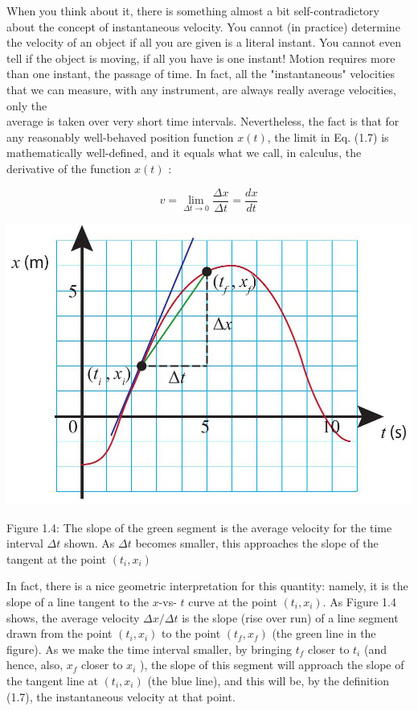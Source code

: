 \documentclass[10pt]{article}
\begin{document}
When you think about it, there is something almost a bit self-contradictory about the concept of instantaneous velocity. You cannot (in practice) determine the velocity of an object if all you are given is a literal instant. You cannot even tell if the object is moving, if all you have is one instant! Motion requires more than one instant, the passage of time. In fact, all the "instantaneous" velocities that we can measure, with any instrument, are always really average velocities, only the\\
average is taken over very short time intervals. Nevertheless, the fact is that for any reasonably well-behaved position function $x(t)$, the limit in Eq. (1.7) is mathematically well-defined, and it equals what we call, in calculus, the derivative of the function $x(t)$ :


\begin{equation*}
v=\lim _{\Delta t \rightarrow 0} \frac{\Delta x}{\Delta t}=\frac{d x}{d t} \tag{1.8}
\end{equation*}


\begin{center}
\includegraphics[max width=\textwidth]{2024_09_14_9969b06773f10b6936e8g-028}
\end{center}

Figure 1.4: The slope of the green segment is the average velocity for the time interval $\Delta t$ shown. As $\Delta t$ becomes smaller, this approaches the slope of the tangent at the point $\left(t_{i}, x_{i}\right)$

In fact, there is a nice geometric interpretation for this quantity: namely, it is the slope of a line tangent to the $x$-vs- $t$ curve at the point $\left(t_{i}, x_{i}\right)$. As Figure 1.4 shows, the average velocity $\Delta x / \Delta t$ is the slope (rise over run) of a line segment drawn from the point $\left(t_{i}, x_{i}\right)$ to the point $\left(t_{f}, x_{f}\right)$ (the green line in the figure). As we make the time interval smaller, by bringing $t_{f}$ closer to $t_{i}$ (and hence, also, $x_{f}$ closer to $x_{i}$ ), the slope of this segment will approach the slope of the tangent line at $\left(t_{i}, x_{i}\right)$ (the blue line), and this will be, by the definition (1.7), the instantaneous velocity at that point.
\end{document}
